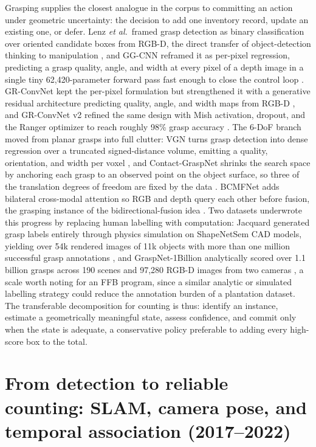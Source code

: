 Grasping supplies the closest analogue in the corpus to committing an action under geometric uncertainty: the decision to add one inventory record, update an existing one, or defer. Lenz \textit{et al.}\ framed grasp detection as binary classification over oriented candidate boxes from RGB-D, the direct transfer of object-detection thinking to manipulation \cite{lenz2015grasp}, and GG-CNN reframed it as per-pixel regression, predicting a grasp quality, angle, and width at every pixel of a depth image in a single tiny 62{,}420-parameter forward pass fast enough to close the control loop \cite{morrison2018ggcnn}. GR-ConvNet kept the per-pixel formulation but strengthened it with a generative residual architecture predicting quality, angle, and width maps from RGB-D \cite{kumra2020grconvnet}, and GR-ConvNet v2 refined the same design with Mish activation, dropout, and the Ranger optimizer to reach roughly 98\% grasp accuracy \cite{kumra2022grconvnetv2}. The 6-DoF branch moved from planar grasps into full clutter: VGN turns grasp detection into dense regression over a truncated signed-distance volume, emitting a quality, orientation, and width per voxel \cite{breyer2021vgn}, and Contact-GraspNet shrinks the search space by anchoring each grasp to an observed point on the object surface, so three of the translation degrees of freedom are fixed by the data \cite{sundermeyer2021contactgraspnet}. BCMFNet adds bilateral cross-modal attention so RGB and depth query each other before fusion, the grasping instance of the bidirectional-fusion idea \cite{zhang2023bcmfnet}. Two datasets underwrote this progress by replacing human labelling with computation: Jacquard generated grasp labels entirely through physics simulation on ShapeNetSem CAD models, yielding over 54k rendered images of 11k objects with more than one million successful grasp annotations \cite{depierre2018jacquard}, and GraspNet-1Billion analytically scored over 1.1 billion grasps across 190 scenes and 97{,}280 RGB-D images from two cameras \cite{fang2020graspnet}, a scale worth noting for an FFB program, since a similar analytic or simulated labelling strategy could reduce the annotation burden of a plantation dataset. The transferable decomposition for counting is thus: identify an instance, estimate a geometrically meaningful state, assess confidence, and commit only when the state is adequate, a conservative policy preferable to adding every high-score box to the total.

\section{From detection to reliable counting: SLAM, camera pose, and temporal association (2017--2022)}

